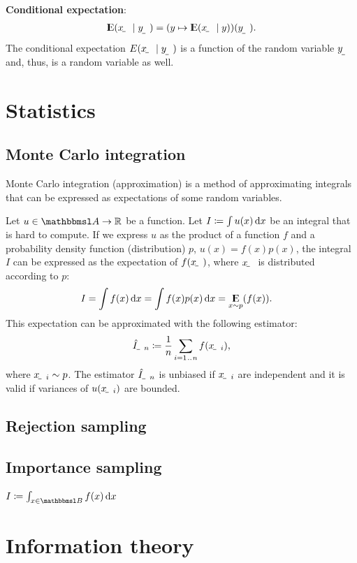 \documentclass{article}
\begin{document}
\textbf{Conditional expectation}:
\begin{align}
    \E\del{\rvar x\mid\rvar y} = \del{y\mapsto \E\del{\rvar x\mid y}}(\rvar{y}) \text.
\end{align}
The conditional expectation $E\del{\rvar x\mid\rvar y}$ is a function of the random variable $\rvar y$ and, thus, is a random variable as well. 

\section{Statistics}

\subsection{Monte Carlo integration}

Monte Carlo integration (approximation) is a method of approximating integrals that can be expressed as expectations of some random variables.

Let $u\in \set A\to \R$ be a function. Let $I\coloneqq\int u(x)\operatorname{d\!} x$ be an integral that is hard to compute. If we express $u$ as the product of a function $f$ and a probability density function (distribution) $p$, $u(x) = f(x)p(x)$, the integral $I$ can be expressed as the expectation of $f(\rvar x)$, where $\rvar x$ is distributed according to $p$:
\begin{align}
    I &= \int f(x)\operatorname{d\!} x = \int f(x)p(x)\operatorname{d\!} x = \operatorname*{\mathrm{I\kern-.282em E}}_{x\sim p}(f(x)) \text .
\end{align}
This expectation can be approximated with the following estimator:
\begin{align} 
    \rvar{\hat I}_n \coloneqq \frac{1}{n}\sum_{i=1\bidot n} f(\rvar x_i) \text{,}
\end{align}
where $\rvar x_i\sim p$. The estimator $\rvar{\hat I}_n$ is unbiased if $\rvar x_i$ are independent and it is valid if variances of $u(\rvar x_i)$ are bounded.

\subsection{Rejection sampling}

\subsection{Importance sampling}
$I\coloneqq\int_{x\in \set B}f(x)\dif x$

\section{Information theory}
\end{document}
